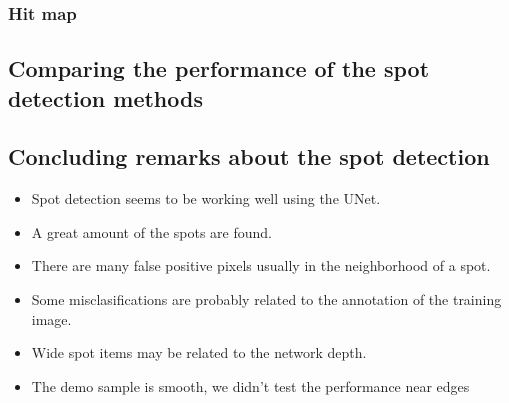 \documentclass[letterpaper,10pt,english]{sphinxmanual}
\begin{document}
\noindent{}


\subsubsection{Hit map}
\label{\detokenize{ML4NeutronImageSegmentation:hit-map}}
\begin{sphinxVerbatim}[commandchars=\\\{\}]
\end{sphinxVerbatim}

\noindent{}


\subsection{Comparing the performance of the spot detection methods}
\label{\detokenize{ML4NeutronImageSegmentation:comparing-the-performance-of-the-spot-detection-methods}}




\subsection{Concluding remarks about the spot detection}
\label{\detokenize{ML4NeutronImageSegmentation:concluding-remarks-about-the-spot-detection}}\begin{itemize}
\item {} 
Spot detection seems to be working well using the U\sphinxhyphen{}Net.

\item {} 
A great amount of the spots are found.

\item {} 
There are many false positive pixels \sphinxhyphen{} usually in the neighborhood of a spot.

\item {} 
Some misclasifications are probably related to the annotation of the training image.

\item {} 
Wide spot items may be related to the network depth.

\item {} 
The demo sample is smooth, we didn’t test the performance near edges

\end{itemize}
\end{document}
